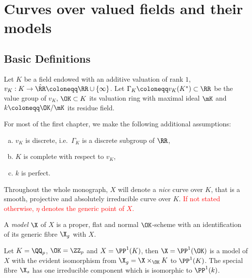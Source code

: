 

\chapter{Curves over valued fields and their models}\label{ch:curves-over-valued-fields-and-their-models}

\section{Basic Definitions}\label{sec:basic-definitions}
Let $K$ be a field endowed with an additive valuation of rank $1$, $v_K: K \to \hat{\RR} \coloneqq \RR\cup \lbrace\infty\rbrace$.
Let $\Gamma_K \coloneqq v_K(K^*) \subset \RR$ be the value group of $v_K$, $\OK \subset K$ its valuation ring with
maximal ideal $\mK$ and $k \coloneqq \OK /\mK$ its residue field.

For most of the first chapter, we make the following additional assumptions:
\begin{assumption} \label{ass:v_K}
    \begin{enumerate}[(a)]
        \item $v_K$ is discrete, i.e.\ $\Gamma_K$ is a discrete subgroup of $\RR$,
        \item $K$ is complete with respect to $v_K$,
        \item $k$ is perfect.
    \end{enumerate}
\end{assumption}

Throughout the whole monograph, $X$ will denote a \textit{nice} curve over $K$,
that is a smooth, projective and absolutely irreducible curve over $K$.
\textcolor{red}{If not stated otherwise, $\eta$ denotes the generic point of $X$.}

\begin{definition} \label{def:model}
    A \textit{model} $\X$ of $X$ is a proper, flat and normal $\OK $-scheme
    with an identification of its generic fibre $\X_g$ with $X$.
\end{definition}

\begin{example}
    Let $K = \QQ_p$, $\OK  = \ZZ_p$ and $X = \PP^1(K)$, then $\X = \PP^1(\OK )$ is a model of $X$ with the
    evident isomorphism from $\X_g = \X \times_{\OK} K$ to $\PP^1(K)$.
    The special fibre $\X_s$ has one irreducible component which is isomorphic to $\PP^1(k)$.
\end{example}

